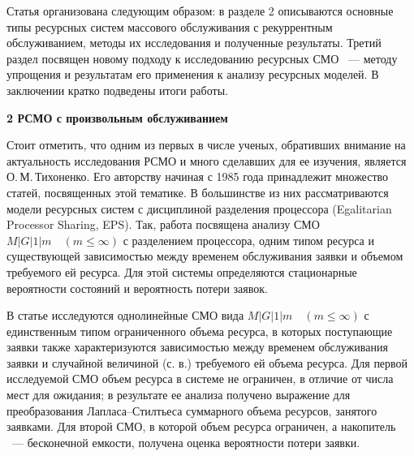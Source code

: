 \documentclass[a4paper,12pt]{article}
\begin{document}
Статья организована следующим образом: в разделе 2 описываются основные типы ресурсных систем массового обслуживания с рекуррентным обслуживанием, методы их исследования и полученные результаты. Третий раздел посвящен новому подходу к исследованию ресурсных СМО ~--- методу упрощения и результатам его применения к анализу ресурсных моделей. В заключении кратко подведены итоги работы.

\vspace{\baselineskip}     %

\noindent
\textbf{2 РСМО с произвольным обслуживанием}

Стоит отметить, что одним из первых в числе ученых, обративших внимание на актуальность исследования РСМО и много сделавших для ее изучения, является О.\,М.\,Тихоненко. Его авторству начиная с 1985 года \cite{Tihonenko_27_1985} принадлежит множество статей, посвященных этой тематике. В большинстве из них рассматриваются модели ресурсных систем с дисциплиной разделения процессора (Egalitarian Processor Sharing, EPS). Так, работа \cite{Tihonenko_22_2001} посвящена анализу СМО $M|G|1|m \quad (m\leq\infty)$ с разделением процессора, одним типом ресурса и существующей зависимостью между временем обслуживания заявки и объемом требуемого ей ресурса. Для этой системы определяются стационарные вероятности состояний и вероятность потери заявок.

В статье \cite{Tihonenko_24_1990} исследуются однолинейные СМО вида $M|G|1|m \quad (m\leq\infty)$ с единственным типом ограниченного объема ресурса, в которых поступающие заявки также характеризуются зависимостью между временем обслуживания заявки и случайной величиной (с. в.) требуемого ей объема ресурса. Для первой исследуемой СМО объем ресурса в системе не ограничен, в отличие от числа мест для ожидания; в результате ее анализа получено выражение для преобразования Лапласа--Стилтьеса суммарного объема ресурсов, занятого заявками. Для второй СМО, в которой объем ресурса ограничен, а накопитель ~--- бесконечной емкости, получена оценка вероятности потери заявки.
\end{document}
